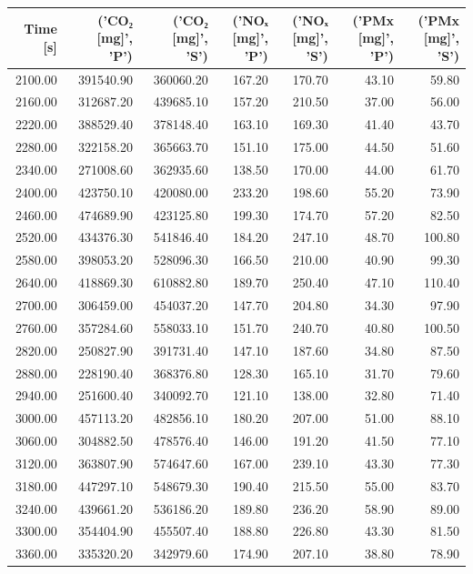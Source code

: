 \begin{tabular}{r|rr|rr|rr|}
\toprule
Time [s] & ('CO₂ [mg]', 'P') & ('CO₂ [mg]', 'S') & ('NOₓ [mg]', 'P') & ('NOₓ [mg]', 'S') & ('PMx [mg]', 'P') & ('PMx [mg]', 'S') \\
\midrule
2100.00 & 391540.90 & 360060.20 & 167.20 & 170.70 & 43.10 & 59.80 \\
2160.00 & 312687.20 & 439685.10 & 157.20 & 210.50 & 37.00 & 56.00 \\
2220.00 & 388529.40 & 378148.40 & 163.10 & 169.30 & 41.40 & 43.70 \\
2280.00 & 322158.20 & 365663.70 & 151.10 & 175.00 & 44.50 & 51.60 \\
2340.00 & 271008.60 & 362935.60 & 138.50 & 170.00 & 44.00 & 61.70 \\
2400.00 & 423750.10 & 420080.00 & 233.20 & 198.60 & 55.20 & 73.90 \\
2460.00 & 474689.90 & 423125.80 & 199.30 & 174.70 & 57.20 & 82.50 \\
2520.00 & 434376.30 & 541846.40 & 184.20 & 247.10 & 48.70 & 100.80 \\
2580.00 & 398053.20 & 528096.30 & 166.50 & 210.00 & 40.90 & 99.30 \\
2640.00 & 418869.30 & 610882.80 & 189.70 & 250.40 & 47.10 & 110.40 \\
2700.00 & 306459.00 & 454037.20 & 147.70 & 204.80 & 34.30 & 97.90 \\
2760.00 & 357284.60 & 558033.10 & 151.70 & 240.70 & 40.80 & 100.50 \\
2820.00 & 250827.90 & 391731.40 & 147.10 & 187.60 & 34.80 & 87.50 \\
2880.00 & 228190.40 & 368376.80 & 128.30 & 165.10 & 31.70 & 79.60 \\
2940.00 & 251600.40 & 340092.70 & 121.10 & 138.00 & 32.80 & 71.40 \\
3000.00 & 457113.20 & 482856.10 & 180.20 & 207.00 & 51.00 & 88.10 \\
3060.00 & 304882.50 & 478576.40 & 146.00 & 191.20 & 41.50 & 77.10 \\
3120.00 & 363807.90 & 574647.60 & 167.00 & 239.10 & 43.30 & 77.30 \\
3180.00 & 447297.10 & 548679.30 & 190.40 & 215.50 & 55.00 & 83.70 \\
3240.00 & 439661.20 & 536186.20 & 189.80 & 236.20 & 58.90 & 89.00 \\
3300.00 & 354404.90 & 455507.40 & 188.80 & 226.80 & 43.30 & 81.50 \\
3360.00 & 335320.20 & 342979.60 & 174.90 & 207.10 & 38.80 & 78.90 \\

\end{tabular}
